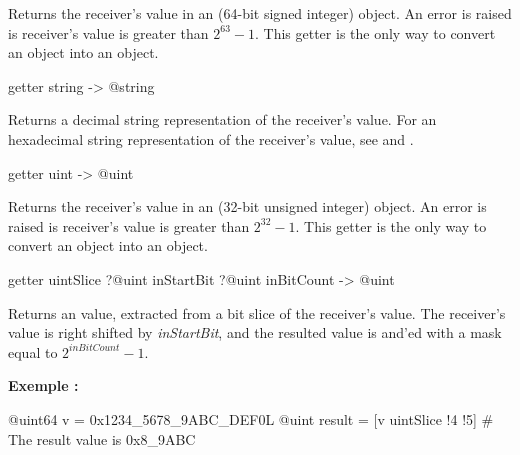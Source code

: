 Returns the receiver's value in an  (64-bit signed integer) object. An error is raised is receiver's value is greater than $2^{63}-1$. This getter is the only way to convert an  object into an  object.



\begin{galgas}
getter string -> @string
\end{galgas}

Returns a decimal string representation of the receiver's value. For an hexadecimal string representation of the receiver's value, see  and .




\begin{galgas}
getter uint -> @uint
\end{galgas}

Returns the receiver's value in an  (32-bit unsigned integer) object. An error is raised is receiver's value is greater than $2^{32}-1$. This getter is the only way to convert an  object into an  object.



\begin{galgas}
getter uintSlice ?@uint inStartBit ?@uint inBitCount -> @uint
\end{galgas}



Returns an  value, extracted from a bit slice of the receiver's value. The receiver's value is right shifted by \emph{inStartBit}, and the resulted value is and'ed with a mask equal to $2^{inBitCount}-1$.


\textbf{Exemple :}
\begin{galgas}
@uint64 v = 0x1234_5678_9ABC_DEF0L
@uint result = [v uintSlice !4 !5] # The result value is 0x8_9ABC
\end{galgas}





